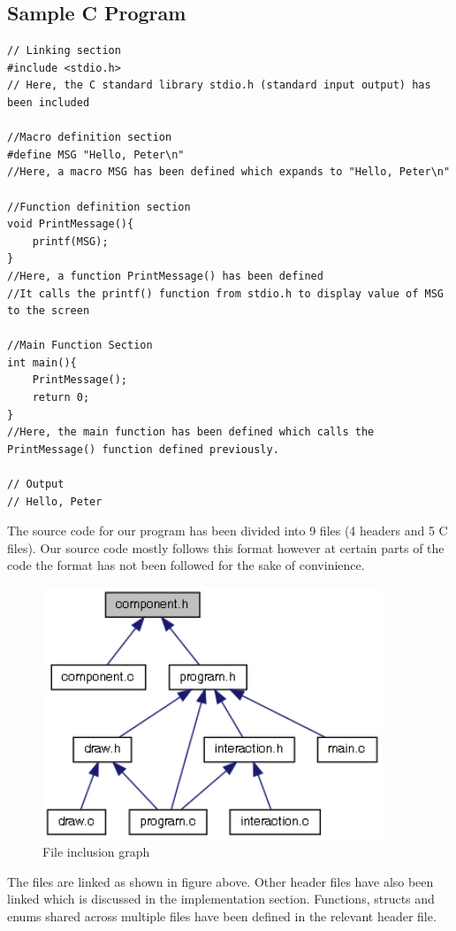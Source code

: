 \documentclass[report]{subfiles}
\begin{document}
    \subsection{Sample C Program}
\begin{lstlisting}
// Linking section
#include <stdio.h>
// Here, the C standard library stdio.h (standard input output) has been included

//Macro definition section
#define MSG "Hello, Peter\n"
//Here, a macro MSG has been defined which expands to "Hello, Peter\n"

//Function definition section
void PrintMessage(){
    printf(MSG);
}
//Here, a function PrintMessage() has been defined
//It calls the printf() function from stdio.h to display value of MSG to the screen

//Main Function Section
int main(){
    PrintMessage();
    return 0;
}
//Here, the main function has been defined which calls the PrintMessage() function defined previously.

// Output
// Hello, Peter
\end{lstlisting}
    The source code for our program has been divided into 9 files (4 headers and 5 C files). Our source code mostly follows this format however at certain parts of the code the format has not been followed for the sake of convinience.
    \begin{figure}[H]
        \centering
        \includegraphics[width=4in]{graphics/component_8h__dep__incl.png}
        \caption{File inclusion graph}
    \end{figure}
    The files are linked as shown in figure above. Other header files have also been linked which is discussed in the implementation section. Functions, structs and enums shared across multiple files have been defined in the relevant header file.
\end{document}
